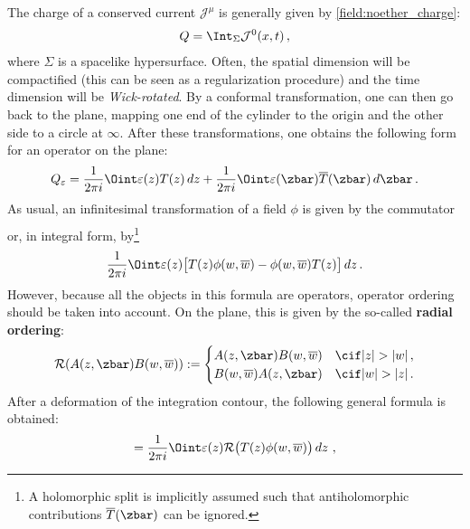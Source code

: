     The charge of a conserved current $\mathcal{J}^\mu$ is generally given by \cref{field:noether_charge}:
    \begin{gather}
        Q = \Int_\Sigma\mathcal{J}^0(x,t)\,,
    \end{gather}
    where $\Sigma$ is a spacelike hypersurface. Often, the spatial dimension will be compactified (this can be seen as a regularization procedure) and the time dimension will be \textit{Wick-rotated}. By a conformal transformation, one can then go back to the plane, mapping one end of the cylinder to the origin and the other side to a circle at $\infty$. After these transformations, one obtains the following form for an operator on the plane:
    \begin{gather}
        Q_\varepsilon = \frac{1}{2\pi i}\Oint\varepsilon(z)T(z)\,dz + \frac{1}{2\pi i}\Oint\varepsilon(\zbar)\overline{T}(\zbar)\,d\zbar\,.
    \end{gather}
    As usual, an infinitesimal transformation of a field $\phi$ is given by the commutator
    \begin{gather}
        [Q_\varepsilon,\phi(w,\overline{w})]
    \end{gather}
    or, in integral form, by\footnote{A holomorphic split is implicitly assumed such that antiholomorphic contributions $\overline{T}(\zbar)$ can be ignored.}
    \begin{gather}
        \frac{1}{2\pi i}\Oint\varepsilon(z)\bigl[T(z)\phi(w,\overline{w}) - \phi(w,\overline{w})T(z)\bigr]\,dz\,.
    \end{gather}
    However, because all the objects in this formula are operators, operator ordering should be taken into account. On the plane, this is given by the so-called \textbf{radial ordering}:
    \begin{gather}
        \mathcal{R}(A(z,\zbar)B(w,\overline{w})) :=
        \begin{cases}
            A(z,\zbar)B(w,\overline{w})&\cif|z|>|w|\,,\\
            B(w,\overline{w})A(z,\zbar)&\cif|w|>|z|\,.
        \end{cases}
    \end{gather}
    After a deformation of the integration contour, the following general formula is obtained:
    \begin{gather}
        [Q_\varepsilon,\phi(w,\overline{w})] = \frac{1}{2\pi i}\Oint\varepsilon(z)\mathcal{R}\bigl(T(z)\phi(w,\overline{w})\bigr)\,dz\,\,,
    \end{gather}

